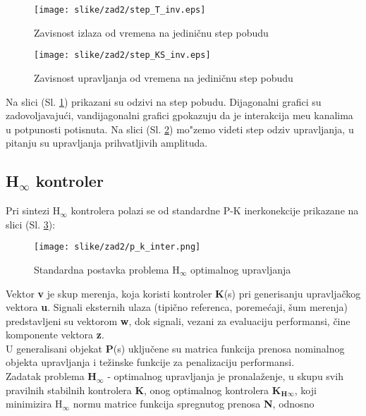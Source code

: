 \documentclass[a4paper,11pt]{article}
\theoremstyle{definition} \newtheorem{deff}{Definicija}[section]
\theoremstyle{definition} \newtheorem{prim}[deff]{Primer}
\theoremstyle{plain} \newtheorem{teor}[deff]{Teorema}
\begin{document}
			\clearpage
			
			
			
			\begin{figure}[!ht]
				\centering
				\texttt{[image: slike/zad2/step\_T\_inv.eps]}
				\caption{Zavisnost izlaza od vremena na jediničnu step pobudu}
				\label{fig:stepT_inv}
			\end{figure}
			
			\begin{figure}[!ht]
				\centering
				\texttt{[image: slike/zad2/step\_KS\_inv.eps]}
				\caption{Zavisnost upravljanja od vremena na jediničnu step pobudu}
				\label{fig:stepKS_inv}
			\end{figure}
			
			Na slici (Sl. \ref{fig:stepT_inv}) prikazani su odzivi na step pobudu. Dijagonalni grafici su zadovoljavajući, vandijagonalni grafici gpokazuju da je interakcija me\dj{}u kanalima u potpunosti potisnuta. Na slici (Sl. \ref{fig:stepKS_inv}) mo"zemo videti step odziv upravljanja, u pitanju su upravljanja prihvatljivih amplituda.
			
			\newpage
			\subsection{H$_\infty$ kontroler}
			
			Pri sintezi H$_\infty$ kontrolera polazi se od standardne P-K inerkonekcije prikazane na slici (Sl. \ref{fig:p_k_inter}):
			
			\begin{figure}[!h]
				\centering
				\texttt{[image: slike/zad2/p\_k\_inter.png]}
				\caption{Standardna postavka problema H$_\infty$ optimalnog upravljanja }
				\label{fig:p_k_inter}
			\end{figure}
			
			Vektor \textbf{v} je skup merenja, koja koristi kontroler \textbf{K}(s) pri generisanju upravljačkog vektora \textbf{u}. Signali eksternih ulaza (tipično referenca, poremećaji, šum merenja) predstavljeni su vektorom \textbf{w}, dok signali, vezani za evaluaciju performansi, čine komponente vektora \textbf{z}. \\
			
			U generalisani objekat \textbf{P}(s) uključene su matrica funkcija prenosa nominalnog objekta upravljanja i težinske funkcije za penalizaciju performansi. \\
			
			Zadatak problema \textbf{H}$_\infty$ - optimalnog upravljanja je pronalaženje, u skupu svih
			pravilnih stabilnih kontrolera \textbf{K}, onog optimalnog kontrolera $\textbf{K}_{\textbf{H}\infty}$, koji
			minimizira H$_\infty$ normu matrice funkcija spregnutog prenosa \textbf{N}, odnosno
			
\end{document}
